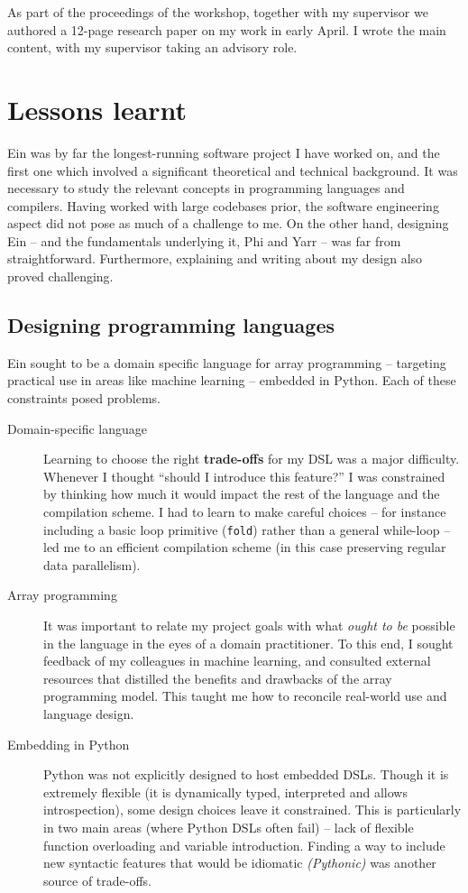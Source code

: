 As part of the proceedings of the workshop, together with my supervisor we authored a 12-page research paper on my work in early April. I wrote the main content, with my supervisor taking an advisory role. 


\needspace{2em}
\section{Lessons learnt}

Ein was by far the longest-running software project I have worked on, and the first one which involved a significant theoretical and technical background. 
It was necessary to study the relevant concepts in programming languages and compilers.
Having worked with large codebases prior, the software engineering aspect did not pose as much of a challenge to me. 
On the other hand, designing Ein -- and the fundamentals underlying it, Phi and Yarr -- was far from straightforward. 
Furthermore, explaining and writing about my design also proved challenging. 

\subsection{Designing programming languages}

Ein sought to be a domain specific language for array programming -- targeting practical use in areas like machine learning -- embedded in Python. Each of these constraints posed problems.

\begin{description}
    \item[Domain-specific language] 
    Learning to choose the right \textbf{trade-offs} for my DSL was a major difficulty. 
    Whenever I thought ``should I introduce this feature?'' I was constrained by thinking how much it would impact the rest of the language and the compilation scheme. 
    I had to learn to make careful choices -- for instance including a basic loop primitive (\texttt{fold}) rather than a general while-loop -- led me to an efficient compilation scheme (in this case preserving regular data parallelism).
    \item[Array programming] 
    It was important to relate my project goals with what \textit{ought to be} possible in the language in the eyes of a domain practitioner. 
    To this end, I sought feedback of my colleagues in machine learning, and consulted external resources that distilled the benefits and drawbacks of the array programming model. 
    This taught me how to reconcile real-world use and language design.
    \item[Embedding in Python] 
    Python was not explicitly designed to host embedded DSLs. 
    Though it is extremely flexible (it is dynamically typed, interpreted and allows introspection), some design choices leave it constrained. 
    This is particularly in two main areas (where Python DSLs often fail) -- lack of flexible function overloading and variable introduction. 
    Finding a way to include new syntactic features that would be idiomatic \textit{(Pythonic)} was another source of trade-offs.
\end{description}

